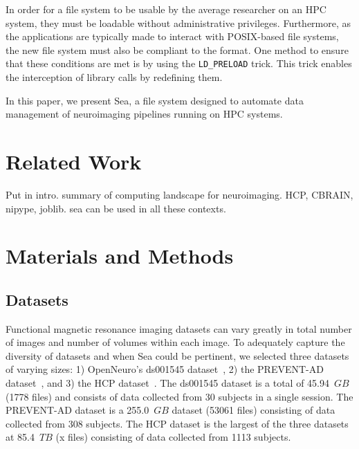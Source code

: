 \documentclass[10pt,journal,compsoc]{IEEEtran}
\begin{document}
In order for a file system to be usable by the average researcher on an HPC system, they must be loadable without administrative
privileges. Furthermore, as the applications are typically made to interact with POSIX-based file systems, the new file system must
also be compliant to the format. One method to ensure that these conditions are met is by using the \texttt{LD\_PRELOAD} trick. This trick
enables the interception of library calls by redefining them. 

In this paper, we present Sea, a file system designed to automate data management of neuroimaging pipelines running on HPC systems.





\section{Related Work}

Put in intro.
summary of computing landscape for neuroimaging.
HCP, CBRAIN, nipype, joblib. sea can be used in all these contexts.


\section{Materials and Methods}
\subsection{Datasets}
Functional magnetic resonance imaging datasets can vary greatly in total number
of images and number of volumes within each image. To adequately capture the 
diversity of datasets and when Sea could be pertinent, we selected three datasets of varying
sizes: 1) OpenNeuro's ds001545 dataset~\cite{ds001545}, 2) the PREVENT-AD  dataset~\cite{preventad}, and
3) the HCP dataset~\cite{hcp}. The ds001545 dataset is a total of 45.94~$GB$ (1778 files) and consists of data collected
from 30 subjects in a single session. The PREVENT-AD dataset is a 255.0~$GB$ dataset (53061 files) consisting of data collected
from 308 subjects. The HCP dataset is the largest of the three datasets at 85.4~$TB$ (x files) consisting of data collected from
1113 subjects.

\end{document}
